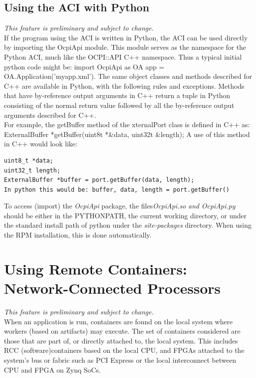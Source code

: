 \documentclass[10pt, a4paper, oneside]{article}
\renewcommand\_{\textunderscore\allowbreak} %
\begin{document}
\subsection{Using the ACI with Python}\hypertarget{Using the ACI with Python}{}
\emph{This feature is preliminary and subject to change.}\\
If the program using the ACI is written in Python, the ACI can be used directly by importing the OcpiApi module. This module serves as the namespace for the Python ACI, much like the OCPI::API C++ namespace.  Thus a typical initial python code might be: import OcpiApi as OA app = OA.Application('myapp.xml'). The same object classes and methods described for C++ are available in Python, with the following rules and exceptions. Methods that have by-reference output arguments in C++ return a tuple in Python consisting of the normal return value followed by all the by-reference output arguments described for C++. \\
For example, the getBuffer method of the xternalPort class is defined in C++ as: ExternalBuffer *getBuffer(uint8\_t *\&data, uint32\_t \&length); A use of this method in C++ would look like:\begin{verbatim}
uint8_t *data;
uint32_t length;
ExternalBuffer *buffer = port.getBuffer(data, length);
In python this would be: buffer, data, length = port.getBuffer() \end{verbatim} To access (import) the \emph{OcpiApi} package, the files\emph{\_OcpiApi.so and OcpiApi.py} should be either in the PYTHONPATH, the current working directory, or under the standard install path of python under the \emph{site-packages} directory.  When using the RPM installation, this is done automatically.
\section{Using Remote Containers: Network-Connected Processors}\label{sec:Using remote containers} \emph{This feature is preliminary and subject to change.}\\
When an application is run, containers are found on the local system where workers (based on artifacts) may execute.  The set of containers considered are those that are part of, or directly attached to, the local system.  This includes RCC (software)containers based on the local CPU, and FPGAs attached to the system's bus or fabric such as PCI Express or the local interconnect between CPU and FPGA on Zynq SoCs. \\
\end{document}
